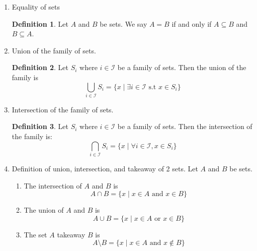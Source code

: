 \documentclass{article}
\theoremstyle{claim}
\theoremstyle{definition}
\newtheorem{definition}{Definition}
\begin{document}
\begin{enumerate}
    \item[27.] Equality of sets
        \begin{definition}
            Let $A$ and $B$ be sets. We say $A = B$ if and only if $A \subseteq B$ and $B \subseteq A$.
        \end{definition}

    \item[28.] Union of the family of sets.
        \begin{definition}
            Let $S_i$ where $i \in \mathcal{I}$ be a family of sets. Then the union of the family is
            \begin{equation*}
                \bigcup\limits_{i \in \mathcal{I}} S_i = \{ x \mid \exists i \in \mathcal{I} \text{ s.t } x \in S_i \}
            \end{equation*}
        \end{definition}

    \item[29.] Intersection of the family of sets.
        \begin{definition}
            Let $S_i$ where $i \in \mathcal{I}$ be a family of sets. Then the intersection of the family is:
            \begin{equation*}
                \bigcap\limits_{i \in \mathcal{I}} S_i = \{ x \mid \forall i \in \mathcal{I}, x \in S_i \}
            \end{equation*}
        \end{definition}

    \item[30.] Definition of union, intersection, and takeaway of 2 sets.
        Let $A$ and $B$ be sets.
        \begin{enumerate}
            \item[1.] The intersection of $A$ and $B$ is
                \begin{equation*}
                    A \cap B = \{ x \mid x \in A \text{ and } x \in B \}
                \end{equation*}
            \item[2.] The union of $A$ and $B$ is
                \begin{equation*}
                    A \cup B = \{ x \mid x \in A \text{ or } x \in B \}
                \end{equation*}
            \item[3.] The set $A$ takeaway $B$ is
                \begin{equation*}
                    A \setminus B = \{ x \mid x \in A \text{ and } x \notin B \}
                \end{equation*}
        \end{enumerate}


\end{enumerate}
\end{document}
